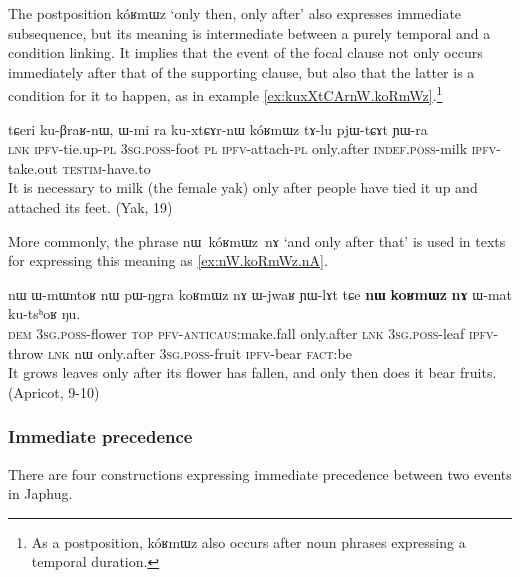 \documentclass[oldfontcommands,oneside,a4paper,11pt]{article}
\newcommand{\ipa}[1]{{\phon \mbox{#1}}} %
\begin{document}
The postposition \ipa{kóʁmɯz} `only then, only after' also expresses immediate subsequence, but its meaning is intermediate between a purely temporal and a condition linking. It implies that the event of the focal clause not only occurs immediately after that of the supporting clause, but also that the latter is a condition for it to happen, as  in example \ref{ex:kuxXtCArnW.koRmWz}.\footnote{As a postposition, \ipa{kóʁmɯz} also occurs after noun phrases expressing a temporal duration.}


\begin{exe}
\ex \label{ex:kuxXtCArnW.koRmWz}
\gll
\ipa{tɕeri}  	\ipa{ku-βraʁ-nɯ,}  	\ipa{ɯ-mi}  	\ipa{ra}  	\ipa{ku-xtɕɤr-nɯ}  	\ipa{kóʁmɯz}  	\ipa{tɤ-lu}  	\ipa{pjɯ-tɕɤt}  	\ipa{ɲɯ-ra}  \\
\textsc{lnk} \textsc{ipfv}-tie.up-\textsc{pl} \textsc{3sg.poss}-foot \textsc{pl} \textsc{ipfv}-attach-\textsc{pl} only.after \textsc{indef.poss}-milk \textsc{ipfv}-take.out  \textsc{testim}-have.to \\
\glt It is necessary to milk (the female yak) only after people have tied it up and attached its feet. (Yak, 19)
\end{exe}

More commonly, the phrase \ipa{nɯ kóʁmɯz nɤ} `and only after that' is used in texts for expressing this meaning as \ref{ex:nW.koRmWz.nA}.
\begin{exe}
\ex \label{ex:nW.koRmWz.nA}
\gll
\ipa{nɯ}  	\ipa{ɯ-mɯntoʁ}  	\ipa{nɯ}  	\ipa{pɯ-ŋgra}  	\ipa{koʁmɯz}  	\ipa{nɤ}  	\ipa{ɯ-jwaʁ}  	\ipa{ɲɯ-lɤt}  	\ipa{tɕe}  	\ipa{\textbf{nɯ}}  	\ipa{\textbf{koʁmɯz}}  	\ipa{\textbf{nɤ}}  	\ipa{ɯ-mat}  	\ipa{ku-tsʰoʁ}  	\ipa{ŋu.}  	\\
\textsc{dem} \textsc{3sg.poss}-flower \textsc{top} \textsc{pfv}-\textsc{anticaus}:make.fall only.after \textsc{lnk} \textsc{3sg.poss}-leaf \textsc{ipfv}-throw \textsc{lnk}  	\ipa{nɯ} only.after \textsc{3sg.poss}-fruit \textsc{ipfv}-bear \textsc{fact}:be \\
\glt It grows leaves only after its flower has fallen, and only then does it bear fruits. (Apricot, 9-10)
\end{exe}


\subsubsection{Immediate precedence}
There are four constructions expressing immediate precedence between two events in Japhug. 
\end{document}
